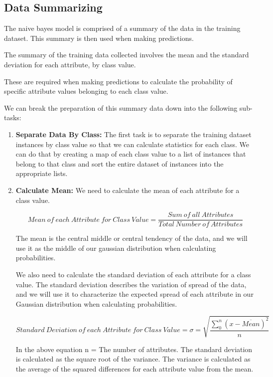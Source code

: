 \subsection{Data Summarizing}{
The naive bayes model is comprised of a summary of the data in the training dataset. This summary is then used when making predictions.

The summary of the training data collected involves the mean and the standard deviation for each attribute, by class value.

These are required when making predictions to calculate the probability of specific attribute values belonging to each class value.

We can break the preparation of this summary data down into the following sub-tasks:

\begin{enumerate}
    \item \textbf{Separate Data By Class:} The first task is to separate the training dataset instances by class value so that we can calculate statistics for each class. We can do that by creating a map of each class value to a list of instances that belong to that class and sort the entire dataset of instances into the appropriate lists.
\item \textbf{Calculate Mean:} We need to calculate the mean of each attribute for a class value.

\begin{equation}
Mean\ of\ each\ Attribute\ for\ Class\ Value = \frac{Sum\ of\ all\ Attributes}{Total\ Number\ of\ Attributes}
\end{equation}

The mean is the central middle or central tendency of the data, and we will use it as the middle of our gaussian distribution when calculating probabilities.

We also need to calculate the standard deviation of each attribute for a class value. The standard deviation describes the variation of spread of the data, and we will use it to characterize the expected spread of each attribute in our Gaussian distribution when calculating probabilities.

\begin{equation}
    Standard\ Deviation\ of\ each\ Attribute\ for\ Class\ Value = \sigma = \sqrt{\frac{\sum_0^n (x-\overline{Mean})^{2}}{n}}
\end{equation}

In the above equation n = The number of attributes.
The standard deviation is calculated as the square root of the variance. The variance is calculated as the average of the squared differences for each attribute value from the mean. 


\end{enumerate}}
